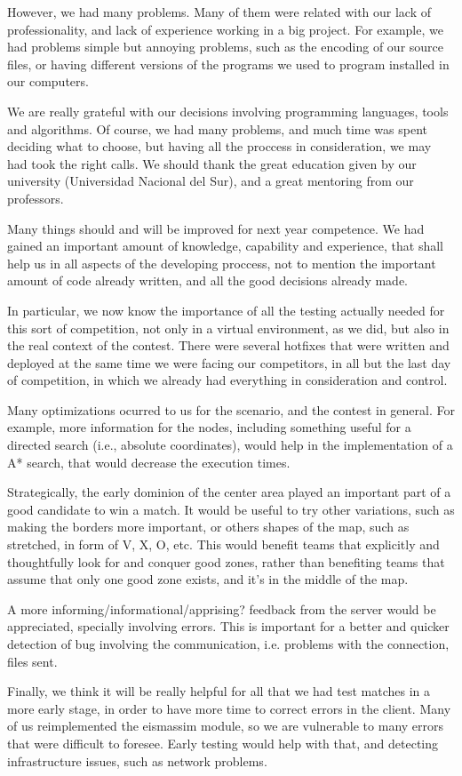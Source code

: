 \documentclass{llncs2e/llncs}
\begin{document}
    However, we had many problems. Many of them were related with our lack of 
    professionality, and lack of experience working in a big project. For example, 
    we had problems simple but annoying problems, such as the encoding of our 
    source files, or having different versions of the programs we used to program
    installed in our computers.

    We are really grateful with our decisions involving programming languages, 
    tools and algorithms. Of course, we had many problems, and much time was spent 
    deciding what to choose, but having all the proccess in consideration, we may 
    had took the right calls. We should thank the great education given by our 
    university (Universidad Nacional del Sur), and a great mentoring from our 
    professors.

    Many things should and will be improved for next year competence. We had 
    gained an important amount of knowledge, capability and experience, that shall 
    help us in all aspects of the developing proccess, not to mention the 
    important amount of code already written, and all the good decisions already 
    made.

    In particular, we now know the importance of all the testing actually needed 
    for this sort of competition, not only in a virtual environment, as we did, 
    but also in the real context of the contest. There were several hotfixes that 
    were written and deployed at the same time we were facing our competitors, in 
    all but the last day of competition, in which we already had everything in 
    consideration and control.

    Many optimizations ocurred to us for the scenario, and the contest in general. 
    For example, more information for the nodes, including something useful for a 
    directed search (i.e., absolute coordinates), would help in the implementation 
    of a A* search, that would decrease the execution times.

    Strategically, the early dominion of the center area played an important part 
    of a good candidate to win a match. It would be useful to try other 
    variations, such as making the borders more important, or others shapes of the 
    map, such as stretched, in form of V, X, O, etc. This would benefit teams that 
    explicitly and thoughtfully look for and conquer good zones, rather than 
    benefiting teams that assume that only one good zone exists, and it's in the 
    middle of the map.

    A more informing/informational/apprising? feedback from the server would be 
    appreciated, specially involving errors. This is important for a better and 
    quicker detection of bug involving the communication, i.e. problems with the 
    connection, files sent.

    Finally, we think it will be really helpful for all that we had test matches 
    in a more early stage, in order to have more time to correct errors in the 
    client. Many of us reimplemented the eismassim module, so we are vulnerable to 
    many errors that were difficult to foresee. Early testing would help with 
    that, and detecting infrastructure issues, such as network problems.
\end{document}
